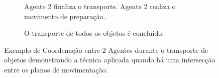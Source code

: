 \begin{figure}[htpb]
  \vspace{0.3cm}
  \begin{subfigure}[t]{0.45\textwidth}
    \centering
    \caption{Agente 2 finaliza o transporte. Agente 2 realiza o movimento de preparação.}
  \end{subfigure}
  \hspace{0.2cm}
  \begin{subfigure}[t]{0.45\textwidth}
    \centering
    \caption{O transporte de todos os objetos é concluído.}
  \end{subfigure}

  \caption[Exemplo de Coordenação entre 2 Agentes durante o transporte de objetos]{Exemplo de Coordenação entre 2 Agentes durante o transporte de objetos demonstrando a técnica aplicada quando há uma intersecção entre os planos de movimentação.}
  \label{fig:priority}
\end{figure}


